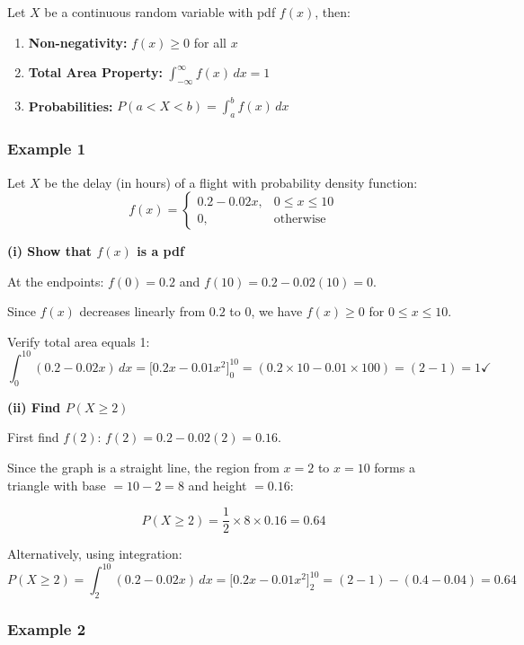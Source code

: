 \documentclass[
]{article}
\begin{document}
Let \(X\) be a continuous random variable with pdf \(f(x)\), then:

\begin{enumerate}
\def\labelenumi{\arabic{enumi}.}
\item
  \textbf{Non-negativity:} \(f(x) \geq 0\) for all \(x\)
\item
  \textbf{Total Area Property:}
  \(\displaystyle\int_{-\infty}^{\infty} f(x)\, dx = 1\)
\item
  \textbf{Probabilities:}
  \(P(a < X < b) = \displaystyle\int_{a}^{b} f(x)\, dx\)
\end{enumerate}

\subsubsection{Example 1}\label{example-1}

Let \(X\) be the delay (in hours) of a flight with probability density
function:
\[f(x) = \begin{cases} 0.2 - 0.02x, & 0 \leq x \leq 10 \\ 0, & \text{otherwise} \end{cases}\]

\textbf{(i) Show that \(f(x)\) is a pdf}

At the endpoints: \(f(0) = 0.2\) and \(f(10) = 0.2 - 0.02(10) = 0\).

Since \(f(x)\) decreases linearly from \(0.2\) to \(0\), we have
\(f(x) \geq 0\) for \(0 \leq x \leq 10\).

Verify total area equals 1:
\[\int_{0}^{10}(0.2 - 0.02x)\,dx = \Big[0.2x - 0.01x^2\Big]_0^{10} = (0.2 \times 10 - 0.01 \times 100) = (2-1) = 1 \checkmark\]

\textbf{(ii) Find \(P(X \geq 2)\)}

First find \(f(2)\): \(f(2) = 0.2 - 0.02(2) = 0.16\).

Since the graph is a straight line, the region from \(x=2\) to \(x=10\)
forms a triangle with base \(= 10-2=8\) and height \(= 0.16\):

\[P(X \geq 2) = \frac{1}{2} \times 8 \times 0.16 = 0.64\]

Alternatively, using integration:
\[P(X \geq 2) = \int_{2}^{10}(0.2 - 0.02x)\,dx = \Big[0.2x - 0.01x^2\Big]_2^{10} = (2-1) - (0.4 - 0.04) = 0.64\]

\subsubsection{Example 2}\label{example-2}
\end{document}
